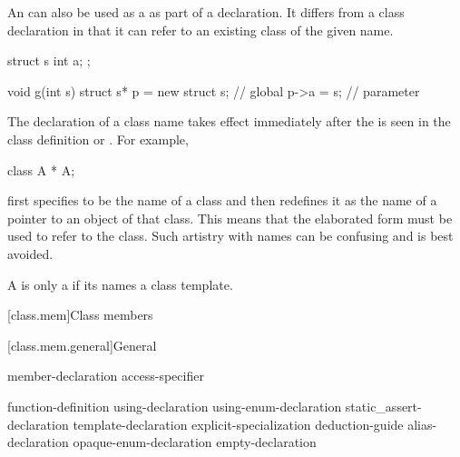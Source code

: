 \pnum
{}%
%
\begin{note}
An  can also
be used as a  as part of a declaration. It
differs from a class declaration in that it can refer to
an existing class of the given name.
\end{note}
\begin{example}
\begin{codeblock}
struct s { int a; };

void g(int s) {
  struct s* p = new struct s;   // global 
  p->a = s;                     // parameter 
}
\end{codeblock}
\end{example}

\pnum
{}%
\begin{note}
The declaration of a class name takes effect immediately after the
 is seen in the class definition or
. For example,
\begin{codeblock}
class A * A;
\end{codeblock}
first specifies  to be the name of a class and then redefines
it as the name of a pointer to an object of that class. This means that
the elaborated form   must be used to refer to the
class. Such artistry with names can be confusing and is best avoided.
\end{note}

\pnum
{}%
A  is only a 
if its  names a class template.

[class.mem]{Class members}%

[class.mem.general]{General}%
%

\begin{bnf}
\br
    member-declaration \br
    access-specifier \terminal{:} 
\end{bnf}

\begin{bnf}
\br
       \terminal{;}\br
    function-definition\br
    using-declaration\br
    using-enum-declaration\br
    static_assert-declaration\br
    template-declaration\br
    explicit-specialization\br
    deduction-guide\br
    alias-declaration\br
    opaque-enum-declaration\br
    empty-declaration
\end{bnf}

